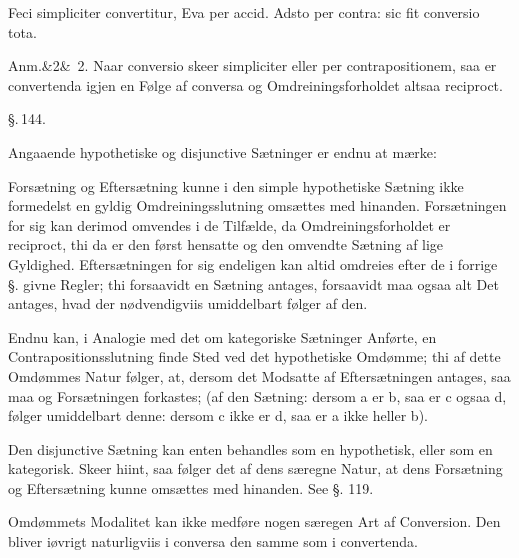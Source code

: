 \documentclass[12pt]{book}
\def\sperr#1{#1}%
\def\textit#1{#1}%
\def\emph#1{#1}%
\def\\{ }%
\newcommand{\sperr}[1]{\textls[180]{#1}}
\newcommand{\parag}[1]{%
  \par\vspace{0.9\baselineskip}%
  {\centering\textit{\S.\,#1.}\par}%
  \vspace{0.35\baselineskip}%
  \noindent\hspace{\parindent}\ignorespaces
}
\newcommand{\anm}[1]{%
  \par\vspace{0.5\baselineskip}%
  \noindent\hspace{\parindent}\sperr{Anm.}\ifx&#1&\else~\textit{#1}.\fi
  \enspace\ignorespaces
}
\newcommand{\opage}[1]{\marginnote{\footnotesize\textit{[#1]}}}
\begin{document}
\par\vspace{0.4\baselineskip}
{\centering
\textit{Feci simpliciter convertitur, Eva per accid.}\\
\textit{Adsto per contra: sic fit conversio tota.}\par}
\vspace{0.4\baselineskip}

\anm{2} Naar \textit{conversio} skeer \textit{simpliciter} eller \textit{per
contrapositionem}, saa er \textit{convertenda} igjen en Følge af
\textit{conversa} og Omdreiningsforholdet altsaa \textit{reciproct}.

\parag{144}

Angaaende hypothetiske og disjunctive Sætninger er endnu at mærke:

Forsætning og Eftersætning kunne i den simple hypothetiske Sætning ikke
formedelst en gyldig Omdreiningsslutning omsættes med hinanden. Forsætningen
for sig kan derimod omvendes i de Tilfælde, da Omdreiningsforholdet er
reciproct, thi da er den først hensatte og den omvendte Sætning af lige
Gyldighed. Eftersætningen for sig endeligen kan altid omdreies efter de i
forrige §. givne Regler; thi forsaavidt en Sætning antages, forsaavidt maa
ogsaa alt Det antages, hvad der nødvendigviis umiddelbart følger af den.

\opage{334} Endnu kan, i Analogie med det om kategoriske Sætninger Anførte, en
Contrapositionsslutning finde Sted ved det hypothetiske Omdømme; thi af dette
Omdømmes Natur følger, at, dersom det Modsatte af Eftersætningen antages, saa
maa og Forsætningen forkastes; (af den Sætning: dersom \textit{a} er
\textit{b}, saa er \textit{c} ogsaa \textit{d}, følger umiddelbart denne:
dersom \textit{c} ikke er \textit{d}, saa er \textit{a} ikke heller
\textit{b}).

Den disjunctive Sætning kan enten behandles som en hypothetisk, eller som en
kategorisk. Skeer hiint, saa følger det af dens særegne Natur, at dens
Forsætning og Eftersætning kunne omsættes med hinanden. See §. 119.

Omdømmets \emph{Modalitet} kan ikke medføre nogen særegen Art af Conversion.
Den bliver iøvrigt naturligviis i \textit{conversa} den samme som i
\textit{convertenda}.
\end{document}
